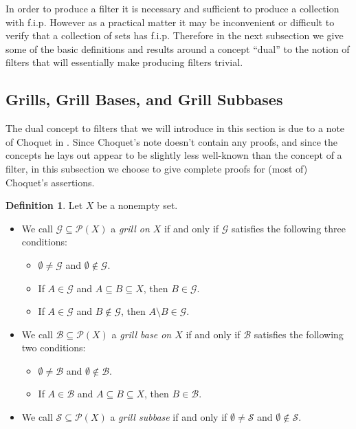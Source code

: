 \documentclass[12pt]{article}
\theoremstyle{plain}
\theoremstyle{definition}
\newtheorem{defn}[thm]{Definition}
\newcommand{\calB}{\mathcal{B}}
\newcommand{\calG}{\mathcal{G}}
\newcommand{\calP}{\mathcal{P}}
\newcommand{\calS}{\mathcal{S}}
\begin{document}
In order to produce a filter it is necessary and sufficient to produce a collection with f.i.p.
However as a practical matter it may be inconvenient or difficult to verify that a collection of sets has f.i.p.
Therefore in the next subsection we give some of the basic definitions and results around a concept ``dual'' to the notion of filters that will essentially make producing filters trivial.

\subsection{Grills, Grill Bases, and Grill Subbases}
The dual concept to filters that we will introduce in this section is due to a note of Choquet in \cite{Choquet:1947uq}. 
Since Choquet's note doesn't contain any proofs, and since the concepts he lays out appear to be slightly less well-known than the concept of a filter, in this subsection we choose to give complete proofs for (most of) Choquet's assertions.

\begin{defn}
  \label{defn:grill}
  Let $X$ be a nonempty set.
  \begin{itemize}
    \item[(a)] We call $\calG \subseteq \calP(X)$ a \textsl{grill on $X$} if and only if $\calG$ satisfies the following three conditions:
      \begin{itemize}
        \item[(1)] $\emptyset \ne \calG$ and $\emptyset \not\in \calG$.

        \item[(2)] If $A \in \calG$ and $A \subseteq B \subseteq X$, then $B \in \calG$.

        \item[(3)] If $A \in \calG$ and $B \not\in \calG$, then $A \setminus B \in \calG$. 
     \end{itemize}

    \item[(b)] We call $\calB \subseteq \calP(X)$ a \textsl{grill base on $X$} if and only if $\calB$     satisfies the following two conditions:
      \begin{itemize}
        \item[(1)] $\emptyset \ne \calB$ and $\emptyset \not\in \calB$.

        \item[(2)] If $A \in \calB$ and $A \subseteq B \subseteq X$, then $B \in \calB$.
      \end{itemize}

    \item[(c)] We call $\calS \subseteq \calP(X)$ a \textsl{grill subbase} if and only if $\emptyset \ne \calS$ and $\emptyset \not\in \calS$. 
  \end{itemize}
\end{defn}
\end{document}
